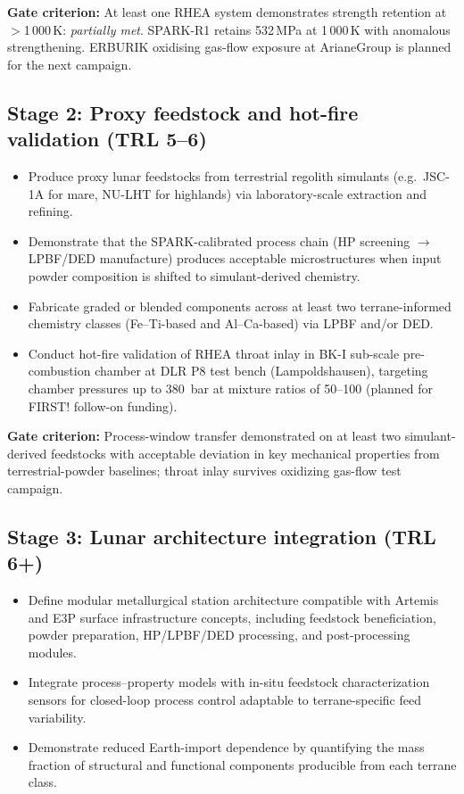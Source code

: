 \documentclass[11pt,a4paper]{article}
\begin{document}
\textbf{Gate criterion:} At least one RHEA system demonstrates strength retention at $>$1\,000\,K: \emph{partially met}. SPARK-R1 retains 532\,MPa at 1\,000\,K with anomalous strengthening. ERBURIK oxidising gas-flow exposure at ArianeGroup is planned for the next campaign.

\subsection*{Stage 2: Proxy feedstock and hot-fire validation (TRL 5--6)}

\begin{itemize}[leftmargin=1.4em]
  \item Produce proxy lunar feedstocks from terrestrial regolith simulants (e.g.\ JSC-1A for mare, NU-LHT for highlands) via laboratory-scale extraction and refining.
  \item Demonstrate that the SPARK-calibrated process chain (HP screening $\rightarrow$ LPBF/DED manufacture) produces acceptable microstructures when input powder composition is shifted to simulant-derived chemistry.
  \item Fabricate graded or blended components across at least two terrane-informed chemistry classes (Fe--Ti-based and Al--Ca-based) via LPBF and/or DED.
  \item Conduct hot-fire validation of RHEA throat inlay in BK-I sub-scale pre-combustion chamber at DLR P8 test bench (Lampoldshausen), targeting chamber pressures up to 380~bar at mixture ratios of 50--100 (planned for FIRST! follow-on funding).
\end{itemize}

\textbf{Gate criterion:} Process-window transfer demonstrated on at least two simulant-derived feedstocks with acceptable deviation in key mechanical properties from terrestrial-powder baselines; throat inlay survives oxidizing gas-flow test campaign.

\subsection*{Stage 3: Lunar architecture integration (TRL 6+)}

\begin{itemize}[leftmargin=1.4em]
  \item Define modular metallurgical station architecture compatible with Artemis and E3P surface infrastructure concepts, including feedstock beneficiation, powder preparation, HP/LPBF/DED processing, and post-processing modules.
  \item Integrate process--property models with in-situ feedstock characterization sensors for closed-loop process control adaptable to terrane-specific feed variability.
  \item Demonstrate reduced Earth-import dependence by quantifying the mass fraction of structural and functional components producible from each terrane class.
\end{itemize}
\end{document}
